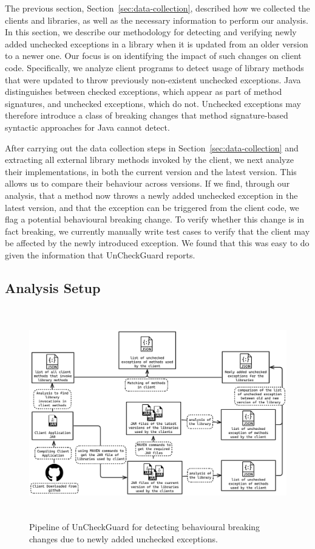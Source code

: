 The previous section, Section~\ref{sec:data-collection}, described how we collected the clients and libraries, as well as the necessary information to perform our analysis.
In this section, we describe our methodology for detecting and verifying newly added unchecked exceptions in a library when it is updated from an older version to a newer one. Our focus is on identifying the impact of such changes on client code. Specifically, we analyze client programs to detect usage of library methods that were updated to throw previously non-existent unchecked exceptions. Java distinguishes between checked exceptions, which appear as part of method signatures, and unchecked exceptions, which do not. Unchecked exceptions may therefore introduce a class of breaking changes that method signature-based syntactic approaches for Java cannot detect.

After carrying out the data collection steps in Section~\ref{sec:data-collection} and extracting all external library methods invoked by the client, we next analyze their implementations, in both the current version and the latest version. This allows us to compare their behaviour across versions. If we find, through our analysis, that a method now throws a newly added unchecked exception in the latest version, and that the exception can be triggered from the client code, we flag a potential behavioural breaking change. To verify whether this change is in fact breaking, we currently manually write test cases to verify that the client may be affected by the newly introduced exception. We found that this was easy to do given the information that UnCheckGuard reports.

\subsection{Analysis Setup}

\begin{figure}[hbt!]
    \centering
    \includegraphics[height=260pt]{diagram/finalPipeline.png}
    \caption{Pipeline of UnCheckGuard for detecting behavioural breaking changes due to newly added unchecked exceptions.}
    \label{fig:jsonjava}
\end{figure}

